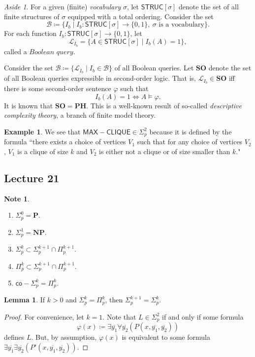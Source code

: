 \documentclass[10pt,letterpaper,cm]{nupset}
\theoremstyle{definition}
\newtheorem{exmp}[definition]{Example}
\newtheorem{note}[definition]{Note}
\theoremstyle{theorem}
\newtheorem{lemma}[definition]{Lemma}
\theoremstyle{remark}
\newtheorem*{aside}{Aside}
\newcommand{\1}{\mathbf{1}}
\newcommand{\0}{\vec 0}
\begin{document}
\begin{aside}
For a given (finite) \textit{vocabulary} $\sigma$, let $\mathsf{STRUC}[\sigma]$ denote the set of all  finite structures of $\sigma$ equipped with a total ordering. Consider the set $$\mathcal{B} \coloneqq \{I_b \mid I_b :   \mathsf{STRUC}[\sigma] \to \{0,1\},\  \sigma \text{ is a vocabulary}\}.$$ For each  function $I_b :  \mathsf{STRUC}[\sigma] \to \{0,1\}$, let $$\mathcal{L}_{I_b} = \{A \in \mathsf{STRUC}[\sigma] \mid I_b(A) = 1\},$$ called a $\textit{Boolean query}$. 

Consider the set $\mathcal{B} \coloneqq \{ \mathcal{L}_{I_b} \mid I_b \in \mathcal{B}\}$ of all Boolean queries. Let $\mathbf{SO}$ denote the set of all Boolean queries expressible in second-order logic. That is, $\mathcal{L}_{I_b} \in \mathbf{SO}$ iff there is some second-order sentence $\varphi$ such that $$I_b(A) =1 \iff A \models \varphi.$$ It is known that $\mathbf{SO} = \mathbf{PH}$. This is a well-known result of so-called \textit{descriptive complexity theory}, a branch of finite model theory.
\end{aside}

\begin{exmp} 
We see that $\mathsf{MAX{-}CLIQUE} \in \Sigma^2_p$ because it is defined by the formula ``there exists a choice of vertices $V_1$ such that for any choice of vertices $V_2$, $V_1$ is a clique of size $k$ and $V_2$ is either not a clique or of size smaller than $k$."
\end{exmp}

\subsection{Lecture 21}

\begin{note} $ $
\begin{enumerate}
\item $\Sigma_p^0 = \mathbf{P}$.
\item $\Sigma_p^1 = \mathbf{NP} $.
\item $\Sigma^k_p \subset \Sigma^{k+1}_p \cap \Pi^{k+1}_p$.
\item $\Pi^k_p \subset \Sigma^{k+1}_p \cap \Pi^{k+1}_p$.
\item $\mathsf{co}{-}\Sigma^k_p = \Pi^k_p$. 
\end{enumerate}
\end{note}

\begin{lemma}
If $k>0$ and $\Sigma_p^k = \Pi^k_p$, then $\Sigma^{k+1}_p = \Sigma^k_p$.
\end{lemma}
\begin{proof}
For convenience, let $k=1$. Note that $L \in \Sigma^2_p$ if and only if some formula $$\varphi(x)\coloneqq \exists{\overline{y_1}}\forall{\overline{y_2}}(P(x, \overline{y_1}, \overline{y_2}))$$ defines $L$. But, by assumption, $\varphi(x)$ is equivalent to some formula  $ \exists{\overline{y_1}}\exists{\overline{y_2}}(P'(x, \overline{y_1}, \overline{y_2}))$.
\end{proof}
\end{document}
